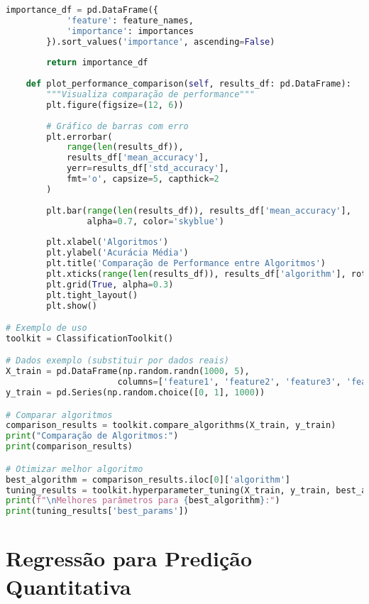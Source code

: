 \begin{pythonbox}
\begin{lstlisting}[language=Python]          
        importance_df = pd.DataFrame({
            'feature': feature_names,
            'importance': importances
        }).sort_values('importance', ascending=False)
        
        return importance_df
    
    def plot_performance_comparison(self, results_df: pd.DataFrame):
        """Visualiza comparação de performance"""
        plt.figure(figsize=(12, 6))
        
        # Gráfico de barras com erro
        plt.errorbar(
            range(len(results_df)), 
            results_df['mean_accuracy'],
            yerr=results_df['std_accuracy'],
            fmt='o', capsize=5, capthick=2
        )
        
        plt.bar(range(len(results_df)), results_df['mean_accuracy'], 
                alpha=0.7, color='skyblue')
        
        plt.xlabel('Algoritmos')
        plt.ylabel('Acurácia Média')
        plt.title('Comparação de Performance entre Algoritmos')
        plt.xticks(range(len(results_df)), results_df['algorithm'], rotation=45)
        plt.grid(True, alpha=0.3)
        plt.tight_layout()
        plt.show()

# Exemplo de uso
toolkit = ClassificationToolkit()

# Dados exemplo (substituir por dados reais)
X_train = pd.DataFrame(np.random.randn(1000, 5), 
                      columns=['feature1', 'feature2', 'feature3', 'feature4', 'feature5'])
y_train = pd.Series(np.random.choice([0, 1], 1000))

# Comparar algoritmos
comparison_results = toolkit.compare_algorithms(X_train, y_train)
print("Comparação de Algoritmos:")
print(comparison_results)

# Otimizar melhor algoritmo
best_algorithm = comparison_results.iloc[0]['algorithm']
tuning_results = toolkit.hyperparameter_tuning(X_train, y_train, best_algorithm)
print(f"\nMelhores parâmetros para {best_algorithm}:")
print(tuning_results['best_params'])
\end{lstlisting}
\end{pythonbox}

\section{Regressão para Predição Quantitativa}

